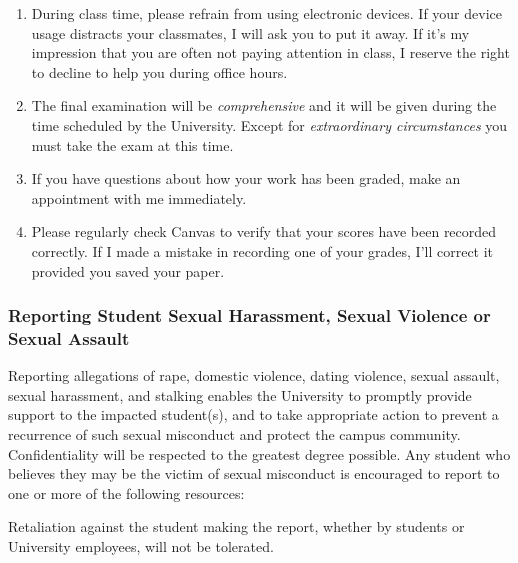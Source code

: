 \documentclass[12pt]{article}
\newcounter{ex}\setcounter{ex}{0}
\renewenvironment{description}[0]{\begin{compactdesc}}{\end{compactdesc}}
\begin{document}
\begin{enumerate}
 

\item During class time, please refrain from using electronic devices. If your 
device usage distracts your classmates, I will ask you to put it away. If it's my 
impression that you are often not paying attention in class, I reserve the right to 
decline to help you during office hours.

\item The final examination will be \emph{comprehensive} and it will be given 
during the  time scheduled by the University. Except for \emph{extraordinary circumstances}
you must take the exam at this time.
 
\item If you have questions about how your work has been graded, make an appointment with me immediately.


\item Please regularly check Canvas  to verify that your scores have 
been recorded correctly.  If I made a mistake in recording one of
your grades, I'll correct it provided you saved your paper.

\end{enumerate}

\newpage

\subsubsection*{Reporting Student Sexual Harassment, Sexual Violence or Sexual Assault}

Reporting allegations of rape, domestic violence, dating violence, sexual assault, sexual harassment, and stalking enables the University to promptly provide support to the impacted student(s), and to take appropriate action to prevent a recurrence of such sexual misconduct and protect the campus community. Confidentiality will be respected to the greatest degree possible. Any student who believes they may be the victim of sexual misconduct is encouraged to report to one or more of the following resources:
\begin{description}
    \item[Local Domestic Violence, Sexual Assault Advocacy Agency]

    \item[Campus Police (or Security)]
    
    \item[Title IX Coordinator]

\end{description}
Retaliation against the student making the report, whether by students or University employees, will not be tolerated.
\end{document}
